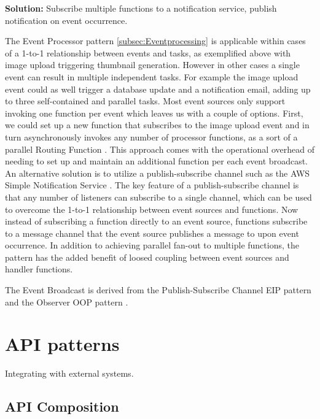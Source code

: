 \textbf{Solution:} Subscribe multiple functions to a notification service, publish notification on event occurrence.

The Event Processor pattern \ref{subsec:Eventprocessing} is applicable within cases of a 1-to-1 relationship between events and tasks, as exemplified above with image upload triggering thumbnail generation. However in other cases a single event can result in multiple independent tasks. For example the image upload event could as well trigger a database update and a notification email, adding up to three self-contained and parallel tasks. Most event sources only support invoking one function per event which leaves us with a couple of options. First, we could set up a new function that subscribes to the image upload event and in turn asynchronously invokes any number of processor functions, as a sort of a parallel Routing Function \label{subsec:routingFunction}. This approach comes with the operational overhead of needing to set up and maintain an additional function per each event broadcast. An alternative solution is to utilize a publish-subscribe channel such as the AWS Simple Notification Service \parencite{awslambda0218}. The key feature of a publish-subscribe channel is that any number of listeners can subscribe to a single channel, which can be used to overcome the 1-to-1 relationship between event sources and functions. Now instead of subscribing a function directly to an event source, functions subscribe to a message channel that the event source publishes a message to upon event occurrence. In addition to achieving parallel fan-out to multiple functions, the pattern has the added benefit of loosed coupling between event sources and handler functions. \parencite{sbarski2017serverless}

The Event Broadcast is derived from the Publish-Subscribe Channel EIP pattern \parencite{hohpe2004enterprise} and the Observer OOP pattern \parencite{gamma94designPatterns}.

\section{API patterns} \label{sec:apiPatterns}

Integrating with external systems.

\subsection{API Composition} \label{subsec:apiComposition}

